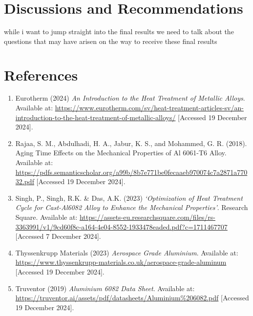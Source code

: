 \documentclass{article}
\begin{document}
    
    \newpage\vspace*{-30pt}
    \section{Discussions and Recommendations}
    while i want to jump straight into the final results we need to talk about the questions that may have arisen on the way to receive these final results
    
    
    \newpage\vspace*{-5pt}
    \section{References}
    \begin{enumerate}
        \item Eurotherm (2024) \textit{An Introduction to the Heat Treatment of Metallic Alloys}. Available at: \url{https://www.eurotherm.com/sv/heat-treatment-articles-sv/an-introduction-to-the-heat-treatment-of-metallic-alloys/} [Accessed 19 December 2024].
        
        \item Rajaa, S. M., Abdulhadi, H. A., Jabur, K. S., and Mohammed, G. R. (2018). Aging Time Effects on the Mechanical Properties of Al 6061-T6 Alloy. Available at: \url{https://pdfs.semanticscholar.org/a99b/8b7e771be0fecaaeb970074c7a2871a77032.pdf} [Accessed 19 December 2024].        

        \item Singh, P., Singh, R.K. \& Das, A.K. (2023) \textit{‘Optimization of Heat Treatment Cycle for Cast-Al6082 Alloy to Enhance the Mechanical Properties’}. Research Square. Available at: \url{https://assets-eu.researchsquare.com/files/rs-3363991/v1/9cd60f8c-a164-4e04-8552-1933478eaded.pdf?c=1711467707} [Accessed 7 December 2024].
        
        \item Thyssenkrupp Materials (2023) \textit{Aerospace Grade Aluminium}. Available at: \url{https://www.thyssenkrupp-materials.co.uk/aerospace-grade-aluminum} [Accessed 19 December 2024].
        
        \item Truventor (2019) \textit{Aluminium 6082 Data Sheet}. Available at: \url{https://truventor.ai/assets/pdf/datasheets/Aluminium%206082.pdf} [Accessed 19 December 2024].
        

\end{enumerate}
\end{document}
